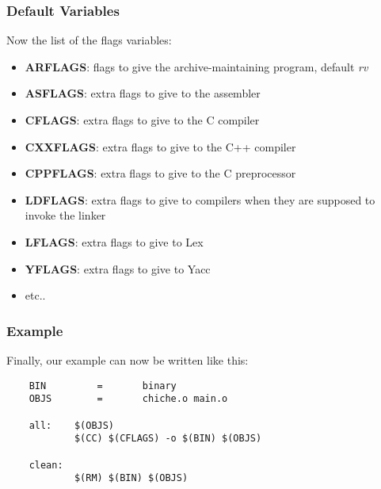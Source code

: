 \documentclass[8pt]{beamer}
\begin{document}

\begin{frame}
  \frametitle{Default Variables}

  Now the list of the flags variables:

  \begin{itemize}
    \item
      \textbf{ARFLAGS}: flags to give the archive-maintaining program,
      default \textit{rv}
    \item
      \textbf{ASFLAGS}: extra flags to give to the assembler
    \item
      \textbf{CFLAGS}: extra flags to give to the C compiler
    \item
      \textbf{CXXFLAGS}: extra flags to give to the C++ compiler
    \item
      \textbf{CPPFLAGS}: extra flags to give to the C preprocessor
    \item
      \textbf{LDFLAGS}: extra flags to give to compilers when they are
      supposed to invoke the linker
    \item
      \textbf{LFLAGS}: extra flags to give to Lex
    \item
      \textbf{YFLAGS}: extra flags to give to Yacc
    \item
      etc..
  \end{itemize}
\end{frame}


\begin{frame}[containsverbatim]
  \frametitle{Example}

  Finally, our example can now be written like this:

  \begin{verbatim}
    BIN         =       binary
    OBJS        =       chiche.o main.o

    all:    $(OBJS)
            $(CC) $(CFLAGS) -o $(BIN) $(OBJS)

    clean:
            $(RM) $(BIN) $(OBJS)
  \end{verbatim}
\end{frame}

\end{document}
